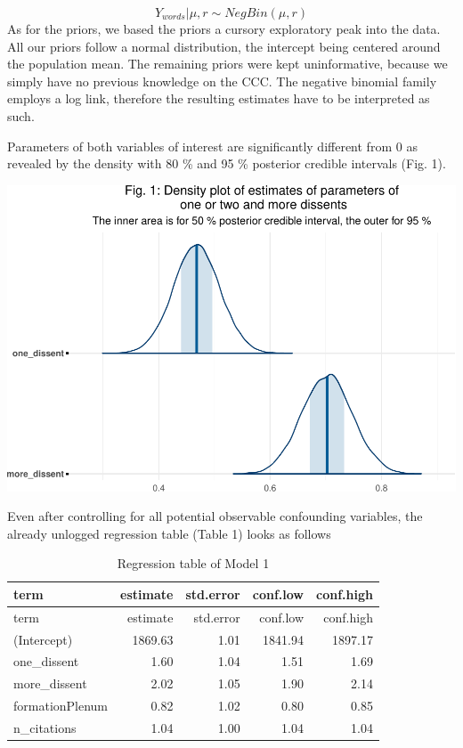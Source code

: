 \documentclass[
  11pt,
]{article}
\begin{document}
\[
Y_{words} | \mu, r \sim NegBin(\mu, r)
\] As for the priors, we based the priors a cursory exploratory peak
into the data. All our priors follow a normal distribution, the
intercept being centered around the population mean. The remaining
priors were kept uninformative, because we simply have no previous
knowledge on the CCC. The negative binomial family employs a log link,
therefore the resulting estimates have to be interpreted as such.

\vspace{25pt}

Parameters of both variables of interest are significantly different
from 0 as revealed by the density with 80 \% and 95 \% posterior
credible intervals (Fig. 1).

\vspace{25pt}

\includegraphics{dissents_article_anonymised_files/figure-latex/length_parameter_plots-1.pdf}
\vspace{25pt}

Even after controlling for all potential observable confounding
variables, the already unlogged regression table (Table 1) looks as
follows

\begin{longtable}[]{@{}lrrrr@{}}
\caption{Regression table of Model 1}\tabularnewline
\toprule\noalign{}
term & estimate & std.error & conf.low & conf.high \\
\midrule\noalign{}
\endfirsthead
\toprule\noalign{}
term & estimate & std.error & conf.low & conf.high \\
\midrule\noalign{}
\endhead
\bottomrule\noalign{}
\endlastfoot
(Intercept) & 1869.63 & 1.01 & 1841.94 & 1897.17 \\
one\_dissent & 1.60 & 1.04 & 1.51 & 1.69 \\
more\_dissent & 2.02 & 1.05 & 1.90 & 2.14 \\
formationPlenum & 0.82 & 1.02 & 0.80 & 0.85 \\
n\_citations & 1.04 & 1.00 & 1.04 & 1.04 \\
\end{longtable}
\end{document}
